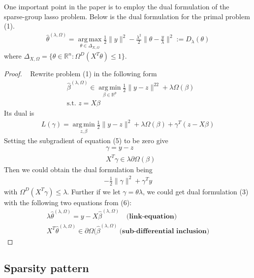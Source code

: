 \documentclass{article}
\DeclareMathOperator*{\argmin}{arg\,min}
\DeclareMathOperator*{\argmax}{arg\,max}
\def\real{\mathbb{R}}
\begin{document}
One important point in the paper is to employ the dual formulation of the sparse-group lasso problem.  Below is the dual formulation for the primal problem (1). 
\begin{align}
\hat{\theta}^{(\lambda,\Omega)} = \argmax\limits_{\theta \in \Delta_{X,\Omega}} \frac{1}{2} \|y\|^2 - \frac{\lambda^2}{2}\|\theta - \frac{y}{\lambda}\|^2 := D_{\lambda}(\theta)
\end{align}
where $\Delta_{X,\Omega} = \{\theta \in \real^n : \Omega^D(X^T\theta) \leq 1\}$. 
\begin{proof} ~\newline
Rewrite problem (1) in the following form 
\begin{equation}
\begin{aligned}
& \hat{\beta}^{(\lambda,\Omega)} \in \argmin\limits_{\beta \in \real^p} \frac{1}{2}\|y - z\|^22 + \lambda \Omega(\beta) \\
& \text{s.t. } z = X\beta 
\end{aligned}
\end{equation}
Its dual is 
\begin{align}
L(\gamma) = \argmin\limits_{z,\beta} \frac{1}{2}\|y-z\|^2 + \lambda \Omega(\beta) + \gamma^T(z-X\beta)
\end{align}
Setting the subgradient of equation (5) to be zero give
\begin{equation}
\begin{aligned}
& \gamma = y - z \\ 
&  X^T \gamma \in \lambda \partial \Omega(\beta)
\end{aligned}
\end{equation}
Then we could obtain the dual formulation being
\begin{align}
-\frac{1}{2}\|\gamma\|^2 + \gamma^Ty
\end{align}
with $\Omega^D(X^T\gamma) \leq \lambda$.  Further if we let $\gamma = \theta \lambda$, we could get dual formulation (3) with the following two equations from (6):
\begin{align}
\lambda \hat{\theta}^{(\lambda,\Omega)} = y - X \hat{\beta}^{(\lambda,\Omega)} \quad \textbf{(link-equation)} \\
X^T \hat{\theta}^{(\lambda,\Omega)} \in \partial \Omega(\hat{\beta}^{(\lambda,\Omega)} \ \textbf{(sub-differential inclusion)}
\end{align}
\end{proof}



\subsection{Sparsity pattern}
\end{document}
